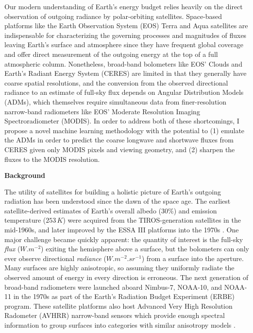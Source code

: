 \documentclass[11pt]{article}
\begin{document}
Our modern understanding of Earth's energy budget relies heavily on the direct observation of outgoing radiance by polar-orbiting satellites. Space-based platforms like the Earth Observation System (EOS) Terra and Aqua satellites are indispensable for characterizing the governing processes and magnitudes of fluxes leaving Earth's surface and atmosphere since they have frequent global coverage and offer direct measurement of the outgoing energy at the top of a full atmospheric column. Nonetheless, broad-band bolometers like EOS' Clouds and Earth's Radiant Energy System (CERES) are limited in that they generally have coarse spatial resolutions, and the conversion from the observed directional radiance to an estimate of full-sky flux depends on Angular Distribution Models (ADMs), which themselves require simultaneous data from finer-resolution narrow-band radiometers like EOS' Moderate Resolution Imaging Spectroradiometer (MODIS). In order to address both of these shortcomings, I propose a novel machine learning methodology with the potential to (1) emulate the ADMs in order to predict the coarse longwave and shortwave fluxes from CERES given only MODIS pixels and viewing geometry, and (2) sharpen the fluxes to the MODIS resolution.

\vspace{1em}

\noindent
{\large\textbf{Background}}

The utility of satellites for building a holistic picture of Earth's outgoing radiation has been understood since the dawn of the space age. The earliest satellite-derived estimates of Earth's overall albedo (30\%) and emission temperature ($253\,\si{K}$) were acquired from the TIROS-generation satellites in the mid-1960s, and later improved by the ESSA III platforms into the 1970s \cite{haar_measurements_1971}\cite{suomi_theoretical_1967}. One major challenge became quickly apparent: the quantity of interest is the full-sky \textit{flux} ($\si{W.m^{-2}}$) exiting the hemisphere above a surface, but the bolometers can only ever observe directional \textit{radiance} ($\si{W.m^{-2}.sr^{-1}}$) from a surface into the aperture. Many surfaces are highly anisotropic, so assuming they uniformly radiate the observed amount of energy in every direction is erroneous. The next generation of broad-band radiometers were launched aboard Nimbus-7, NOAA-10, and NOAA-11 in the 1970s as part of the Earth's Radiation Budget Experiment (ERBE) program. These satellite platforms also host Advanced Very High Resolution Radometer (AVHRR) narrow-band sensors which provide enough spectral information to group surfaces into categories with similar anisotropy models \cite{ramanathan_cloud-radiative_1989}\cite{smith_inversion_1986}.
\end{document}
